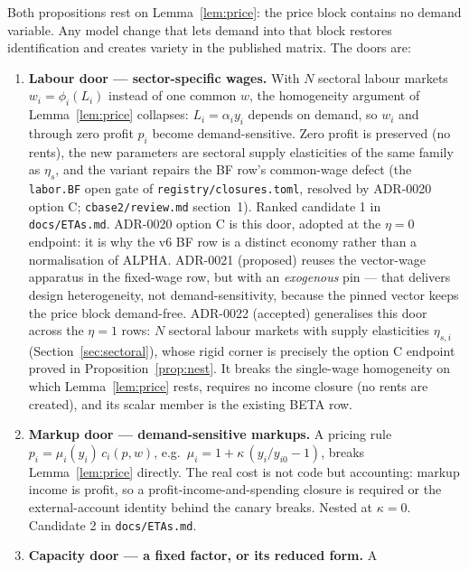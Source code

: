 \documentclass[11pt]{article}
\numberwithin{equation}{section}
\begin{document}
Both propositions rest on Lemma~\ref{lem:price}: the price block contains
no demand variable. Any model change that lets demand into that block
restores identification and creates variety in the published matrix. The
doors are:

\begin{enumerate}
\item \textbf{Labour door --- sector-specific wages.} With $N$ sectoral
      labour markets $w_i = \phi_i(L_i)$ instead of one common $w$, the
      homogeneity argument of Lemma~\ref{lem:price} collapses: $L_i =
      \alpha_i y_i$ depends on demand, so $w_i$ and through zero profit
      $p_i$ become demand-sensitive. Zero profit is preserved (no rents),
      the new parameters are sectoral supply elasticities of the same
      family as $\eta_s$, and the variant repairs the BF row's
      common-wage defect \textcolor{revisionV3}{(the \texttt{labor.BF} open
      gate of \texttt{registry/closures.toml}, resolved by ADR-0020 option C;
      \texttt{cbase2/review.md} section~1)}. Ranked candidate 1 in
      \texttt{docs/ETAs.md}. \textcolor{revisionV1}{ADR-0020 option C is
      this door, adopted at the $\eta = 0$ endpoint: it is why the v6 BF
      row is a distinct economy rather than a normalisation of ALPHA.
      ADR-0021 (proposed) reuses the vector-wage apparatus in the
      fixed-wage row, but with an \emph{exogenous} pin --- that delivers
      design heterogeneity, not demand-sensitivity, because the pinned
      vector keeps the price block demand-free.}
      \textcolor{revisionV2}{ADR-0022 (accepted) generalises this door across
      the $\eta = 1$ rows: $N$ sectoral labour markets with supply elasticities
      $\eta_{s,i}$ (Section~\ref{sec:sectoral}), whose rigid corner is precisely
      the option C endpoint proved in Proposition~\ref{prop:nest}. It breaks the
      single-wage homogeneity on which Lemma~\ref{lem:price} rests, requires no
      income closure (no rents are created), and its scalar member is the
      existing BETA row.}
\item \textbf{Markup door --- demand-sensitive markups.} A pricing rule
      $p_i = \mu_i(y_i)\, c_i(p,w)$, e.g.\ $\mu_i = 1 + \kappa\,(y_i/y_{i0}
      - 1)$, breaks Lemma~\ref{lem:price} directly. The real cost is not
      code but accounting: markup income is profit, so a
      profit-income-and-spending closure is required or the external-account
      identity behind the canary breaks. Nested at $\kappa = 0$. Candidate 2
      in \texttt{docs/ETAs.md}.
\item \textbf{Capacity door --- a fixed factor, or its reduced form.} A

\end{enumerate}
\end{document}
